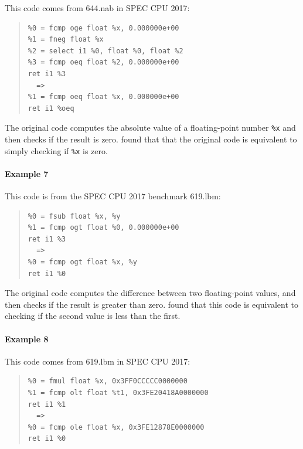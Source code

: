 This code comes from 644.nab in SPEC CPU 2017:

{\begin{quote}\begin{verbatim}
%0 = fcmp oge float %x, 0.000000e+00
%1 = fneg float %x
%2 = select i1 %0, float %0, float %2
%3 = fcmp oeq float %2, 0.000000e+00
ret i1 %3
  =>
%1 = fcmp oeq float %x, 0.000000e+00
ret i1 %oeq
\end{verbatim}
\end{quote}}

The original code computes the absolute value of a floating-point
number \texttt{\%x} and then checks if the result is zero.
\minotaur{} found that that the original code is equivalent to simply checking if
\texttt{\%x} is zero.


\paragraph*{Example 7}

This code is from the SPEC CPU 2017 benchmark 619.lbm:

{\begin{quote}\begin{verbatim}
%0 = fsub float %x, %y
%1 = fcmp ogt float %0, 0.000000e+00
ret i1 %3
  =>
%0 = fcmp ogt float %x, %y
ret i1 %0
\end{verbatim}
\end{quote}}

The original code computes the difference between two floating-point
values, and then checks if the result is greater than zero. \minotaur{}
found that this code is equivalent to checking if the second value is
less than the first.


\paragraph*{Example 8}

This code comes from 619.lbm in SPEC CPU 2017:


{\begin{quote}\begin{verbatim}
%0 = fmul float %x, 0x3FF0CCCCC0000000
%1 = fcmp olt float %t1, 0x3FE20418A0000000
ret i1 %1
  =>
%0 = fcmp ole float %x, 0x3FE12878E0000000
ret i1 %0
\end{verbatim}
\end{quote}}

